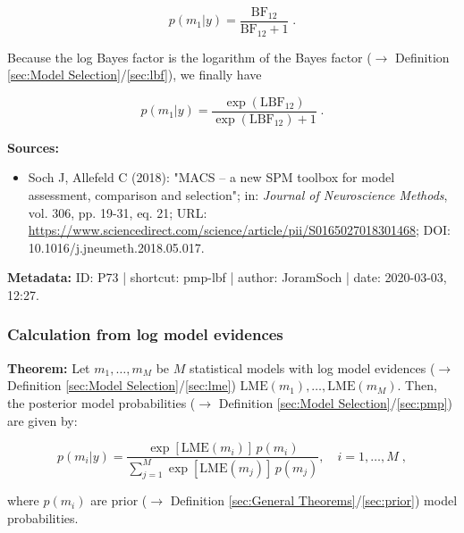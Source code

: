 \documentclass[a4paper,12pt,twoside]{book}
\begin{document}
\begin{equation} \label{eq:pmp-lbf-post-s1}
p(m_1|y) = \frac{\mathrm{BF}_{12}}{\mathrm{BF}_{12} + 1} \; .
\end{equation}

Because the log Bayes factor is the logarithm of the Bayes factor ($\rightarrow$ Definition \ref{sec:Model Selection}/\ref{sec:lbf}), we finally have

\begin{equation} \label{eq:pmp-lbf-post-s2}
p(m_1|y) = \frac{\exp(\mathrm{LBF}_{12})}{\exp(\mathrm{LBF}_{12}) + 1} \; .
\end{equation}


\vspace{1em}
\textbf{Sources:}
\begin{itemize}
\item Soch J, Allefeld C (2018): "MACS – a new SPM toolbox for model assessment, comparison and selection"; in: \textit{Journal of Neuroscience Methods}, vol. 306, pp. 19-31, eq. 21; URL: \url{https://www.sciencedirect.com/science/article/pii/S0165027018301468}; DOI: 10.1016/j.jneumeth.2018.05.017.
\end{itemize}


\vspace{1em}
\textbf{Metadata:} ID: P73 | shortcut: pmp-lbf | author: JoramSoch | date: 2020-03-03, 12:27.
\vspace{1em}



\subsubsection[\textbf{Calculation from log model evidences}]{Calculation from log model evidences} \label{sec:pmp-lme}
\setcounter{equation}{0}

\textbf{Theorem:} Let $m_1, \ldots, m_M$ be $M$ statistical models with log model evidences ($\rightarrow$ Definition \ref{sec:Model Selection}/\ref{sec:lme}) $\mathrm{LME}(m_1), \ldots, \mathrm{LME}(m_M)$. Then, the posterior model probabilities ($\rightarrow$ Definition \ref{sec:Model Selection}/\ref{sec:pmp}) are given by:

\begin{equation} \label{eq:pmp-lme-PMP-LME}
p(m_i|y) = \frac{\exp[\mathrm{LME}(m_i)] \, p(m_i)}{\sum_{j=1}^{M} \exp[\mathrm{LME}(m_j)] \, p(m_j)}, \quad i = 1,\ldots,M \; ,
\end{equation}

where $p(m_i)$ are prior ($\rightarrow$ Definition \ref{sec:General Theorems}/\ref{sec:prior}) model probabilities.
\end{document}
